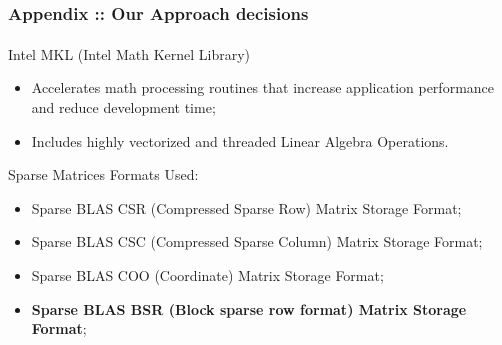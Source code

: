 \documentclass{beamer}
\begin{document}
\begin{frame}
\frametitle{Appendix :: Our Approach decisions}
\begin{block}{Intel\textsuperscript{\tiny\textregistered} MKL (Intel\textsuperscript{\tiny\textregistered} Math Kernel Library)}
\begin{itemize}
    \item Accelerates math processing routines that increase application performance and reduce development time;
    \item Includes highly vectorized and threaded Linear Algebra Operations.
\end{itemize}
\end{block}

\begin{block}{Sparse Matrices Formats Used:}
\begin{itemize}
    \item Sparse BLAS CSR (Compressed Sparse Row) Matrix Storage Format;
    \item Sparse BLAS CSC (Compressed Sparse Column) Matrix Storage Format;
    \item Sparse BLAS COO (Coordinate) Matrix Storage Format;
    \item \textbf{Sparse BLAS BSR (Block sparse row format) Matrix Storage Format};
\end{itemize}
\end{block}

\end{frame}
\end{document}
